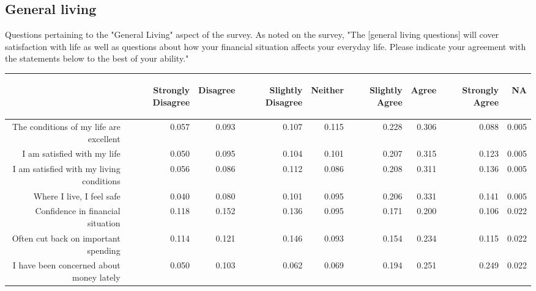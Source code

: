 \documentclass{article}\usepackage[]{graphicx}\usepackage[]{color}
\begin{document}
\subsection{General living}
Questions pertaining to the "General Living" aspect of the survey. As noted on the survey, "The  [general living questions] will cover satisfaction with life as well as questions about how your financial situation affects your everyday life.  Please indicate your agreement with the statements below to the best of your ability."
\begin{table}[ht]
\centering
\begin{tabular}{rrrrrrrrr}
  \hline
 & \begin{sideways} Strongly Disagree \end{sideways} & \begin{sideways} Disagree \end{sideways} & \begin{sideways} Slightly Disagree \end{sideways} & \begin{sideways} Neither \end{sideways} & \begin{sideways} Slightly Agree \end{sideways} & \begin{sideways} Agree \end{sideways} & \begin{sideways} Strongly Agree \end{sideways} & \begin{sideways} NA \end{sideways} \\ 
  \hline
The conditions of my life are excellent & 0.057 & 0.093 & 0.107 & 0.115 & 0.228 & 0.306 & 0.088 & 0.005 \\ 
  I am satisfied with my life & 0.050 & 0.095 & 0.104 & 0.101 & 0.207 & 0.315 & 0.123 & 0.005 \\ 
  I am satisfied with my living conditions & 0.056 & 0.086 & 0.112 & 0.086 & 0.208 & 0.311 & 0.136 & 0.005 \\ 
  Where I live, I feel safe & 0.040 & 0.080 & 0.101 & 0.095 & 0.206 & 0.331 & 0.141 & 0.005 \\ 
  Confidence in financial situation & 0.118 & 0.152 & 0.136 & 0.095 & 0.171 & 0.200 & 0.106 & 0.022 \\ 
  Often cut back on important spending & 0.114 & 0.121 & 0.146 & 0.093 & 0.154 & 0.234 & 0.115 & 0.022 \\ 
  I have been concerned about money lately & 0.050 & 0.103 & 0.062 & 0.069 & 0.194 & 0.251 & 0.249 & 0.022 \\ 
   \hline
\end{tabular}
\end{table}
\end{document}
